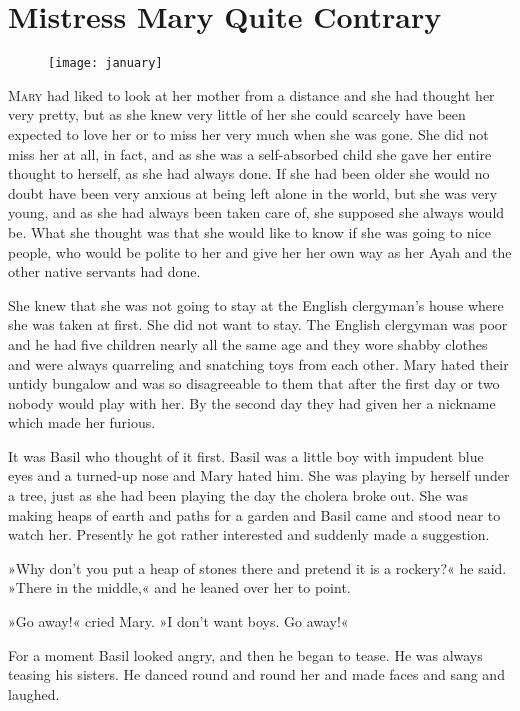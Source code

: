 \chapter{Mistress Mary Quite Contrary} 
	
\begin{figure}[t!]
\centering
\texttt{[image: january]}
\end{figure}

 \lettrine[lines=6]{M}{ary} had liked to look at her mother from a distance and she had thought her very pretty, but as she knew very little of her she could scarcely have been expected to love her or to miss her very much when she was gone. She did not miss her at all, in fact, and as she was a self-absorbed child she gave her entire thought to herself, as she had always done. If she had been older she would no doubt have been very anxious at being left alone in the world, but she was very young, and as she had always been taken care of, she supposed she always would be. What she thought was that she would like to know if she was going to nice people, who would be polite to her and give her her own way as her Ayah and the other native servants had done.

She knew that she was not going to stay at the English clergyman's house where she was taken at first. She did not want to stay. The English clergyman was poor and he had five children nearly all the same age and they wore shabby clothes and were always quarreling and snatching toys from each other. Mary hated their untidy bungalow and was so disagreeable to them that after the first day or two nobody would play with her. By the second day they had given her a nickname which made her furious.

It was Basil who thought of it first. Basil was a little boy with impudent blue eyes and a turned-up nose and Mary hated him. She was playing by herself under a tree, just as she had been playing the day the cholera broke out. She was making heaps of earth and paths for a garden and Basil came and stood near to watch her. Presently he got rather interested and suddenly made a suggestion.

»Why don't you put a heap of stones there and pretend it is a rockery?« he said. »There in the middle,« and he leaned over her to point.

»Go away!« cried Mary. »I don't want boys. Go away!«

For a moment Basil looked angry, and then he began to tease. He was always teasing his sisters. He danced round and round her and made faces and sang and laughed.

